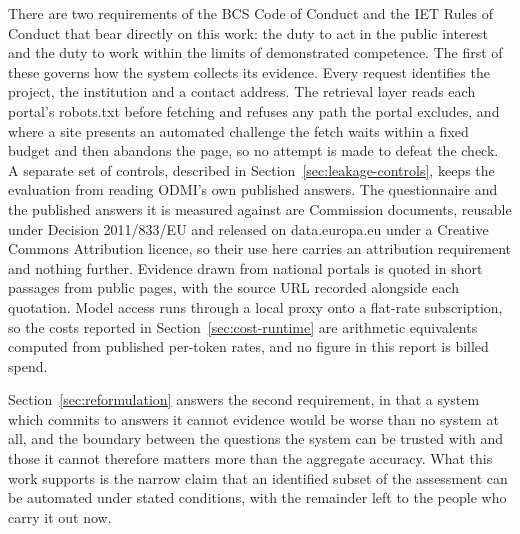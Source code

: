 There are two requirements of the BCS Code of Conduct and the IET Rules of Conduct that bear directly on this work: the duty to act in the public interest and the duty to work within the limits of demonstrated competence. The first of these governs how the system collects its evidence. Every request identifies the project, the institution and a contact address. The retrieval layer reads each portal's robots.txt before fetching and refuses any path the portal excludes, and where a site presents an automated challenge the fetch waits within a fixed budget and then abandons the page, so no attempt is made to defeat the check. A separate set of controls, described in Section~\ref{sec:leakage-controls}, keeps the evaluation from reading ODMI's own published answers. The questionnaire and the published answers it is measured against are Commission documents, reusable under Decision 2011/833/EU and released on data.europa.eu under a Creative Commons Attribution licence, so their use here carries an attribution requirement and nothing further. Evidence drawn from national portals is quoted in short passages from public pages, with the source URL recorded alongside each quotation. Model access runs through a local proxy onto a flat-rate subscription, so the costs reported in Section~\ref{sec:cost-runtime} are arithmetic equivalents computed from published per-token rates, and no figure in this report is billed spend.

Section~\ref{sec:reformulation} answers the second requirement, in that a system which commits to answers it cannot evidence would be worse than no system at all, and the boundary between the questions the system can be trusted with and those it cannot therefore matters more than the aggregate accuracy. What this work supports is the narrow claim that an identified subset of the assessment can be automated under stated conditions, with the remainder left to the people who carry it out now.
